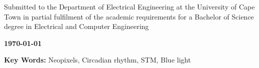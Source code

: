 \vskip 10mm
\begin{center}
Submitted to the Department of Electrical Engineering at the University of Cape Town in partial
fulfilment of the academic requirements for a Bachelor of Science degree in Electrical and Computer Engineering

\end{center}


\vskip 5mm
\begin{center}{\bf \today}
\end{center}

\vskip 5mm
\begin{center}
\textbf{Key Words:} Neopixels, Circadian rhythm, STM, Blue light
\end{center}